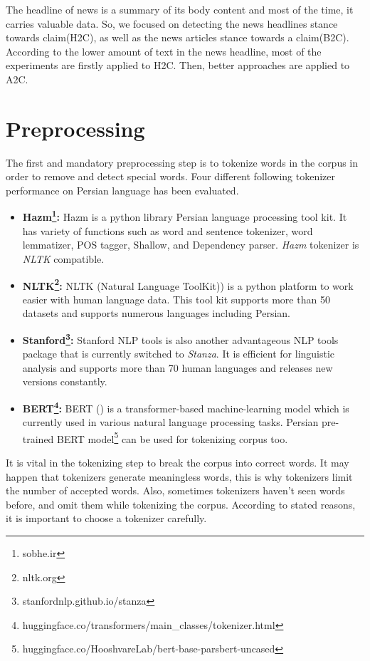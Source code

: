The headline of news is a summary of its body content and most of the time, it carries valuable data. So, we focused on detecting the news headlines stance towards claim(H2C), as well as the news articles stance towards a claim(B2C). According to the lower amount of text in the news headline, most of the experiments are firstly applied to H2C. Then, better approaches are applied to A2C.  
\section{Preprocessing}
The first and mandatory preprocessing step is to tokenize words in the corpus in order to remove and detect special words. Four different following tokenizer performance on Persian language has been evaluated. 
\begin{itemize}
	\item \textbf{Hazm\footnote{\label{fn:hazm}sobhe.ir}:}
	Hazm is a python library Persian language processing tool kit. It has variety of functions such as word and sentence tokenizer, word lemmatizer, POS tagger, Shallow, and Dependency parser. \textit{Hazm} tokenizer is \textit{NLTK} compatible.
	
	\item \textbf{NLTK\footnote{nltk.org}:}
	NLTK (Natural Language ToolKit)) is a python platform to work easier with human language data. This tool kit supports more than 50 datasets and supports numerous languages including Persian. 
	
	\item \textbf{Stanford\footnote{stanfordnlp.github.io/stanza}:}
	Stanford NLP tools is also another advantageous NLP tools package that is currently switched to \textit{Stanza}. It is efficient for linguistic analysis and supports more than 70 human languages and releases new versions constantly.
	
	\item \textbf{BERT\footnote{huggingface.co/transformers/main\_classes/tokenizer.html}:}
	BERT (\cite{bert}) is a transformer-based machine-learning model which is currently used in various natural language processing tasks. Persian pre-trained BERT model\footnote{huggingface.co/HooshvareLab/bert-base-parsbert-uncased} can be used for tokenizing corpus too. 
\end{itemize}

It is vital in the tokenizing step to break the corpus into correct words. It may happen that tokenizers generate meaningless words, this is why tokenizers limit the number of accepted words. Also, sometimes tokenizers haven't seen words before, and omit them while tokenizing the corpus. According to stated reasons, it is important to choose a tokenizer carefully.


